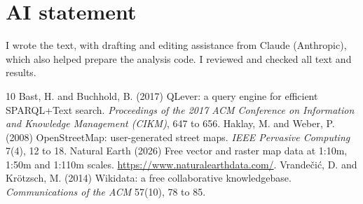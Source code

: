 \documentclass[11pt,a4paper]{article}
\begin{document}
\section*{AI statement}
I wrote the text, with drafting and editing assistance from Claude (Anthropic), which also helped prepare the analysis code. I reviewed and checked all text and results.

\begin{thebibliography}{10}
 Bast, H. and Buchhold, B. (2017) QLever: a query engine for efficient SPARQL+Text search. \textit{Proceedings of the 2017 ACM Conference on Information and Knowledge Management (CIKM)}, 647 to 656.
 Haklay, M. and Weber, P. (2008) OpenStreetMap: user-generated street maps. \textit{IEEE Pervasive Computing} 7(4), 12 to 18.
 Natural Earth (2026) Free vector and raster map data at 1:10m, 1:50m and 1:110m scales. \url{https://www.naturalearthdata.com/}.
 Vrandečić, D. and Krötzsch, M. (2014) Wikidata: a free collaborative knowledgebase. \textit{Communications of the ACM} 57(10), 78 to 85.
\end{thebibliography}

\appendix
\end{document}
